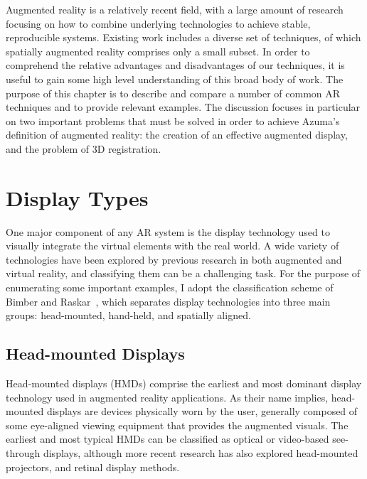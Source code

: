 \documentclass{thesis}
\begin{document}
Augmented reality is a relatively recent field, with a large amount of research focusing on how to combine underlying technologies to achieve stable, reproducible systems. Existing work includes a diverse set of techniques, of which spatially augmented reality comprises only a small subset. In order to comprehend the relative advantages and disadvantages of our techniques, it is useful to gain some high level understanding of this broad body of work. The purpose of this chapter is to describe and compare a number of common AR techniques and to provide relevant examples. The discussion focuses in particular on two important problems that must be solved in order to achieve Azuma's definition of augmented reality: the creation of an effective augmented display, and the problem of 3D registration. 

\section{Display Types}

One major component of any AR system is the display technology used to visually integrate the virtual elements with the real world. A wide variety of technologies have been explored by previous research in both augmented and virtual reality, and classifying them can be a challenging task. For the purpose of enumerating some important examples, I adopt the classification scheme of Bimber and Raskar~\cite{BimberBook}, which separates display technologies into three main groups: head-mounted, hand-held, and spatially aligned.

\subsection{Head-mounted Displays}

Head-mounted displays (HMDs) comprise the earliest and most dominant display technology used in augmented reality applications. As their name implies, head-mounted displays are devices physically worn by the user, generally composed of some eye-aligned viewing equipment that provides the augmented visuals. The earliest and most typical HMDs can be classified as optical or video-based see-through displays, although more recent research has also explored head-mounted projectors, %
and retinal display methods.
\end{document}
